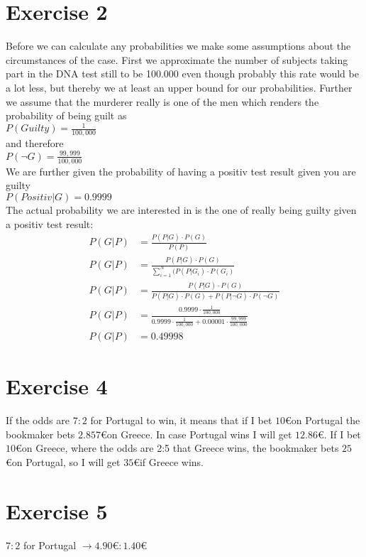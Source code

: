 \def \TutorialSheetNumber{3}


\section*{Exercise 2}
Before we can calculate any probabilities we make some assumptions about the circumstances of the case. First we approximate the number of subjects taking part in the DNA test still to be 100.000 even though probably this rate would be a lot less, but thereby we at least an upper bound for our probabilities. Further we assume that the murderer really is one of the men which renders the probability of being guilt as \\ 
$P(Guilty) = \frac{1}{100,000}$\\
and therefore\\
$P(\neg G) = \frac{99,999}{100,000}$\\
We are further given the probability of having a positiv test result given you are guilty \\
$P(Positiv|G) = 0.9999 $ \\
The actual probability we are interested in is the one of really being guilty given a positiv test result:
\begin{align*}
  P(G | P) & = \frac{P(P|G) \cdot P(G)}{P(P)} \\
  P(G | P) & = \frac{P(P|G) \cdot P(G)}{\sum\limits_{i=1}^{N}(P(P|G_i)\cdot P(G_i)}\\
  P(G | P) & = \frac{P(P|G) \cdot P(G)}{P(P|G)\cdot P(G) + P(P|\neg G)\cdot P(\neg G)} \\
  P(G | P) & = \frac{0.9999 \cdot \frac{1}{100,000}}{0.9999 \cdot \frac{1}{100,000} + 0.00001 \cdot \frac{99,999}{100,000}}\\
  P(G | P) & = 0.49998
\end{align*}
 
\section*{Exercise 4}
If the odds are $7 : 2$ for Portugal to win, it means that if I bet $10$\euro on Portugal the bookmaker bets $2.857$\euro on Greece. In case Portugal wins I will get $12.86$\euro.
If I bet $10$\euro on Greece, where the odds are 2:5 that Greece wins, the bookmaker bets $25$\euro on Portugal, so I will get $35$\euro if Greece wins.

\section*{Exercise 5}
$7 : 2$ for Portugal $\rightarrow 4.90€ : 1.40€$




